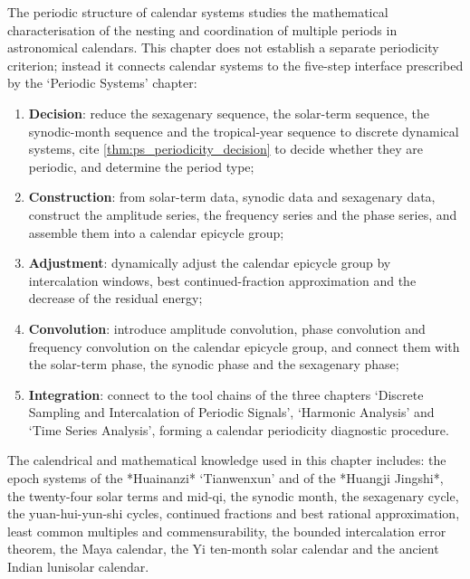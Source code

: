 \begin{remark}\label{rem:calendar_chapter_positioning}
The periodic structure of calendar systems studies the mathematical characterisation of the nesting and coordination of multiple periods in astronomical calendars. This chapter does not establish a separate periodicity criterion; instead it connects calendar systems to the five-step interface prescribed by the `Periodic Systems' chapter:
\begin{enumerate}[label=(\arabic*)]
    \item \textbf{Decision}: reduce the sexagenary sequence, the solar-term sequence, the synodic-month sequence and the tropical-year sequence to discrete dynamical systems, cite \cref{thm:ps_periodicity_decision} to decide whether they are periodic, and determine the period type;
    \item \textbf{Construction}: from solar-term data, synodic data and sexagenary data, construct the amplitude series, the frequency series and the phase series, and assemble them into a calendar epicycle group;
    \item \textbf{Adjustment}: dynamically adjust the calendar epicycle group by intercalation windows, best continued-fraction approximation and the decrease of the residual energy;
    \item \textbf{Convolution}: introduce amplitude convolution, phase convolution and frequency convolution on the calendar epicycle group, and connect them with the solar-term phase, the synodic phase and the sexagenary phase;
    \item \textbf{Integration}: connect to the tool chains of the three chapters `Discrete Sampling and Intercalation of Periodic Signals', `Harmonic Analysis' and `Time Series Analysis', forming a calendar periodicity diagnostic procedure.
\end{enumerate}
The calendrical and mathematical knowledge used in this chapter includes: the epoch systems of the *Huainanzi* `Tianwenxun' and of the *Huangji Jingshi*, the twenty-four solar terms and mid-qi, the synodic month, the sexagenary cycle, the yuan-hui-yun-shi cycles, continued fractions and best rational approximation, least common multiples and commensurability, the bounded intercalation error theorem, the Maya calendar, the Yi ten-month solar calendar and the ancient Indian lunisolar calendar.
\end{remark}

